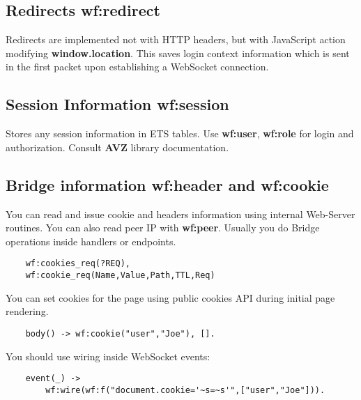 \subsection{Redirects {\bf wf:redirect}}
Redirects are implemented not with HTTP headers, but with JavaScript action modifying {\bf window.location}.
This saves login context information which is sent in the first packet upon establishing a WebSocket connection.

\subsection{Session Information {\bf wf:session}}
Stores any session information in ETS tables. Use {\bf wf:user}, {\bf wf:role} for
login and authorization. Consult {\bf AVZ} library documentation.

\subsection{Bridge information {\bf wf:header} and {\bf wf:cookie}}
You can read and issue cookie and headers information using internal Web-Server routines.
You can also read peer IP with {\bf wf:peer}. Usually you do Bridge operations
inside handlers or endpoints.

\begin{lstlisting}
    wf:cookies_req(?REQ),
    wf:cookie_req(Name,Value,Path,TTL,Req)
\end{lstlisting}

You can set cookies for the page using public cookies API during initial page rendering.

\begin{lstlisting}
    body() -> wf:cookie("user","Joe"), [].
\end{lstlisting}

You should use wiring inside WebSocket events:

\begin{lstlisting}
    event(_) ->
        wf:wire(wf:f("document.cookie='~s=~s'",["user","Joe"])).
\end{lstlisting}
